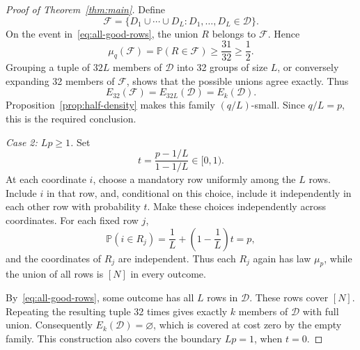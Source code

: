 \documentclass[11pt,letterpaper]{article}
\theoremstyle{definition}
\theoremstyle{remark}
\numberwithin{equation}{section}
\begin{document}
\begin{proof}[Proof of Theorem~\ref{thm:main}]
Define
\[
\mathcal F
=\{D_1\cup\cdots\cup D_L:D_1,\ldots,D_L\in\mathcal D\}.
\]
On the event in~\eqref{eq:all-good-rows}, the union $R$ belongs to
$\mathcal F$. Hence
\[
\mu_q(\mathcal F)=\mathbb P(R\in\mathcal F)
\ge\frac{31}{32}\ge\frac12.
\]
Grouping a tuple of $32L$ members of $\mathcal D$ into 32 groups of
size $L$, or conversely expanding 32 members of $\mathcal F$, shows that
the possible unions agree exactly. Thus
\[
E_{32}(\mathcal F)=E_{32L}(\mathcal D)=E_k(\mathcal D).
\]
Proposition~\ref{prop:half-density} makes this family $(q/L)$-small.
Since $q/L=p$, this is the required conclusion.

\medskip
\noindent\emph{Case 2: $Lp\ge1$.}
Set
\[
t=\frac{p-1/L}{1-1/L}\in[0,1).
\]
At each coordinate $i$, choose a mandatory row uniformly among the $L$
rows. Include $i$ in that row, and, conditional on this choice, include
it independently in each other row with probability $t$.
Make these choices independently across coordinates. For each fixed
row $j$,
\[
\mathbb P(i\in R_j)
=\frac1L+\left(1-\frac1L\right)t=p,
\]
and the coordinates of $R_j$ are independent. Thus each $R_j$ again has
law $\mu_p$, while the union of all rows is $[N]$ in every outcome.

By~\eqref{eq:all-good-rows}, some outcome has all $L$ rows in
$\mathcal D$. These rows cover $[N]$. Repeating the resulting tuple
32 times gives exactly $k$ members of $\mathcal D$ with full union.
Consequently $E_k(\mathcal D)=\varnothing$, which is covered at cost
zero by the empty family. This construction also covers the boundary
$Lp=1$, when $t=0$.
\end{proof}
\end{document}

